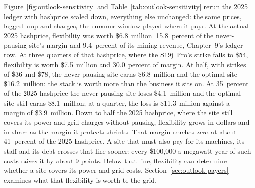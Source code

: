 Figure~\ref{fig:outlook-sensitivity} and Table~\ref{tab:outlook-sensitivity} rerun the 2025 ledger with hashprice scaled down, everything else unchanged: the same prices, lagged loop and charges, the summer window played where it pays. At the actual 2025 hashprice, flexibility was worth \$6.8~million, 15.8~percent of the never-pausing site's margin and 9.4~percent of its mining revenue, Chapter~9's ledger row. At three quarters of that hashprice, where the S19j~Pro's strike falls to \$54, flexibility is worth \$7.5~million and 30.0~percent of margin. At half, with strikes of \$36 and \$78, the never-pausing site earns \$6.8~million and the optimal site \$16.2~million: the stack is worth more than the business it sits on. At 35~percent of the 2025 hashprice the never-pausing site loses \$4.1~million and the optimal site still earns \$8.1~million; at a quarter, the loss is \$11.3~million against a margin of \$3.9~million. %
Down to half the 2025 hashprice, where the site still covers its power and grid charges without pausing, flexibility grows in dollars and in share as the margin it protects shrinks. That margin reaches zero at about 41~percent of the 2025 hashprice. A site that must also pay for its machines, its staff and its debt crosses that line sooner: every \$100,000 a megawatt-year of such costs raises it by about 9 points. %
Below that line, flexibility can determine whether a site covers its power and grid costs. Section~\ref{sec:outlook-payers} examines what that flexibility is worth to the grid.

